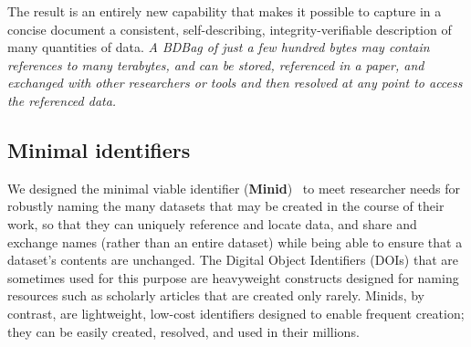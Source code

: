 \documentclass[11pt]{article}
\begin{document}

The result is an entirely new capability that makes it possible to
capture in a concise document a consistent, self-describing, integrity-verifiable description of many quantities of data.
\emph{A BDBag of just a few hundred bytes may contain references to many terabytes, and 
can be stored, referenced in a paper, and exchanged with other researchers or tools
and then resolved at any point to access the referenced data.}




\subsection{Minimal identifiers}

We designed the minimal viable identifier (\textbf{Minid})~\cite{chard16} to meet researcher needs
for robustly naming the many datasets that may be created in the course of their work, 
so that they can uniquely reference and locate data,
and share and exchange names (rather than an entire dataset) 
while being able to ensure that a dataset's contents are unchanged.
The Digital Object Identifiers (DOIs) that are sometimes used for this purpose
are heavyweight constructs designed for naming resources such as scholarly articles
that are created only rarely.
Minids, by contrast, are lightweight, low-cost identifiers designed to enable frequent creation;
they can be easily created, resolved, and used in their millions. 
\end{document}
